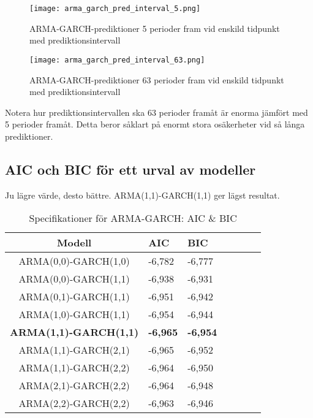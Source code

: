 \documentclass[11pt]{article}
\numberwithin{equation}{section}
\numberwithin{table}{section}
\numberwithin{figure}{section}
\begin{document}
\begin{figure}[H]
\caption{ARMA-GARCH-prediktioner 5 perioder fram vid enskild tidpunkt med prediktionsintervall}
\texttt{[image: arma\_garch\_pred\_interval\_5.png]}
\centering
\end{figure}

\begin{figure}[H]
\caption{ARMA-GARCH-prediktioner 63 perioder fram vid enskild tidpunkt med prediktionsintervall}
\texttt{[image: arma\_garch\_pred\_interval\_63.png]}
\centering
\end{figure}
Notera hur prediktionsintervallen ska 63 perioder framåt är enorma jämfört med 5 perioder framåt. Detta beror såklart på enormt stora osäkerheter vid så långa prediktioner.

\subsection{AIC och BIC för ett urval av modeller}
Ju lägre värde, desto bättre. ARMA(1,1)-GARCH(1,1) ger lägst resultat.

\begin{table}[H]
\caption{Specifikationer för ARMA-GARCH: AIC \& BIC}
\begin{tabularx}{\textwidth}{c *{6}{Y}}
\toprule
Modell  & AIC & BIC  \\
\hline

ARMA(0,0)-GARCH(1,0)            & -6,782                &   -6,777     \\

ARMA(0,0)-GARCH(1,1)            & -6,938         & -6,931    \\


ARMA(0,1)-GARCH(1,1)            & -6,951         & -6,942   \\

ARMA(1,0)-GARCH(1,1)           & -6,954         & -6,944   \\


\textbf{ARMA(1,1)-GARCH(1,1)}           & \textbf{-6,965}          & \textbf{-6,954}
    \\ 

ARMA(1,1)-GARCH(2,1)           & -6,965         & -6,952   \\ 

ARMA(1,1)-GARCH(2,2)           & -6,964        & -6,950
   \\ 

ARMA(2,1)-GARCH(2,2)           &-6,964        & -6,948    \\ 

ARMA(2,2)-GARCH(2,2)           & -6,963         &  -6,946
   \\ 

\bottomrule
\end{tabularx}
\end{table}
\end{document}
